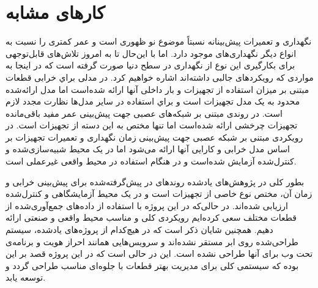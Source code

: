 \section{کارهای مشابه}
نگهداری و تعمیرات پیش‌بینانه نسبتاً موضوع نو ظهوری است و عمر کمتری را نسبت به انواع دیگر نگهداری‌های موجود دارد. اما با این‌حال تا به امروز تلاش‌های قابل‌توجهی برای بکارگیری این نوع از نگهداری در سطح دنیا صورت گرفته است که در اینجا به مواردی که رویکردهای جالبی داشته‌اند اشاره خواهیم کرد. در \cite{tinga2010application} مدلی براي خرابی قطعات مبتنی بر ميزان استفاده از تجهيزات و بار داخلی آنها ارائه شده‌است اما مدل ارائه‌شده محدود به يک مدل تجهيزات است و براي استفاده در ساير مدل‌ها نظارت مجدد لازم است. در \cite{wu2007neural} روندی مبتنی بر شبكه‌های عصبی جهت پيش‌بينی عمر مفيد باقی‌مانده تجهيزات چرخشی ارائه شده‌است اما تنها مختص به اين دسته از تجهيزات است. در \cite{kaiser2009predictive} رويكردی مبتنی بر شبكه عصبی جهت پيش‌بينی زمان نگهداری و تعميرات تجهيزات بر اساس مدل خرابی و كارايی آنها ارائه می‌شود اما در یک محيط شبيه‌سازی‌شده و كنترل‌شده آزمايش شده‌است و در هنگام استفاده در محيط واقعی غيرعملی است.

 بطور كلی در پژوهش‌های يادشده روندهای در پیش‌گرفته‌شده برای پیش‌بینی خرابی و زمان آن، مختص نوع خاصی از تجهيزات است و در يک محيط آزمايشگاهی و كنترل‌شده ارزيابی شده‌اند. در حالی‌كه در اين پروژه با استفاده از داده‌های جمع‌آوری‌شده از قطعات مختلف سعی كرده‌ايم رويكردی كلی و مناسب محيط واقعی و صنعتی ارائه دهيم. همچنین شایان ذکر است که در هیچ‌کدام از پروژه‌های یاد‌شده، سیستم طراحی‌شده روی ابر مستقر نشده‌اند و سرویس‌هایی همانند احراز هویت و برنامه‌ی تحت وب برای آنها طراحی نشده است. این در حالی است که در این پروژه قصد بر این بوده که سیستمی کلی برای مدیریت بهتر قطعات با جلوه‌ای مناسب طراحی گردد و توسعه یابد.
